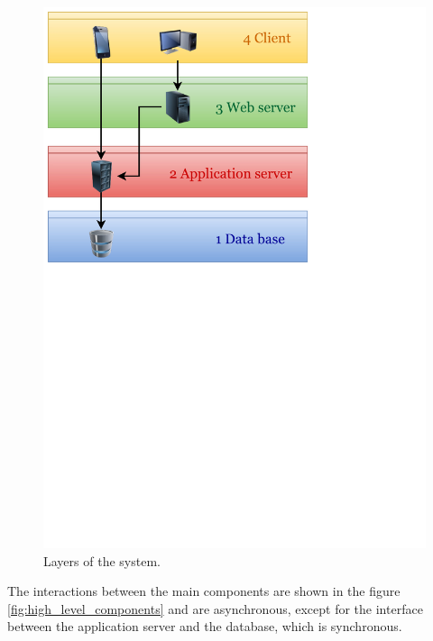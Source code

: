 \begin{figure}[h]
\centering
\includegraphics[width=\textwidth]{diagrams/layers.pdf}
\caption{Layers of the system.}
\label{fig:layers}
\end{figure}

The interactions between the main components are shown in the figure \ref{fig:high_level_components} and are asynchronous, except for the interface between the application server and the database, which is synchronous.

